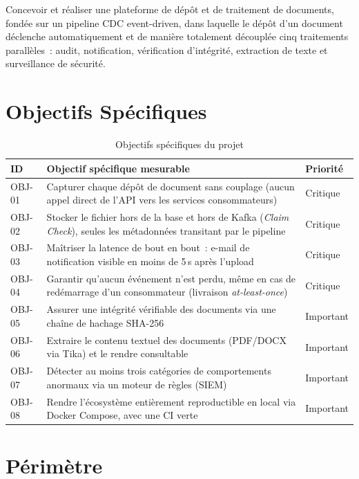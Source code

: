 \documentclass[12pt,a4paper,openany]{report}
\begin{document}
    Concevoir et r\'ealiser une plateforme de d\'ep\^ot et de traitement de documents, fond\'ee sur un pipeline CDC event-driven, dans laquelle le d\'ep\^ot d'un document d\'eclenche automatiquement et de mani\`ere totalement d\'ecoupl\'ee cinq traitements parall\`eles~: audit, notification, v\'erification d'int\'egrit\'e, extraction de texte et surveillance de s\'ecurit\'e.

    \section{Objectifs Sp\'ecifiques}

    \begin{table}[H]
    \centering
    \begin{tabularx}{\textwidth}{lXl}
    \toprule
    \textbf{ID} & \textbf{Objectif sp\'ecifique mesurable} & \textbf{Priorit\'e} \\
    \midrule
    OBJ-01 & Capturer chaque d\'ep\^ot de document sans couplage (aucun appel direct de l'API vers les services consommateurs) & Critique \\
    OBJ-02 & Stocker le fichier hors de la base et hors de Kafka (\emph{Claim Check}), seules les m\'etadonn\'ees transitant par le pipeline & Critique \\
    OBJ-03 & Ma\^itriser la latence de bout en bout~: e-mail de notification visible en moins de 5\,s apr\`es l'upload & Critique \\
    OBJ-04 & Garantir qu'aucun \'ev\'enement n'est perdu, m\^eme en cas de red\'emarrage d'un consommateur (livraison \emph{at-least-once}) & Critique \\
    OBJ-05 & Assurer une int\'egrit\'e v\'erifiable des documents via une cha\^ine de hachage SHA-256 & Important \\
    OBJ-06 & Extraire le contenu textuel des documents (PDF/DOCX via Tika) et le rendre consultable & Important \\
    OBJ-07 & D\'etecter au moins trois cat\'egories de comportements anormaux via un moteur de r\`egles (SIEM) & Important \\
    OBJ-08 & Rendre l'\'ecosyst\`eme enti\`erement reproductible en local via Docker Compose, avec une CI verte & Important \\
    \bottomrule
    \end{tabularx}
    \caption{Objectifs sp\'ecifiques du projet}
    \end{table}

    \section{P\'erim\`etre}
\end{document}
